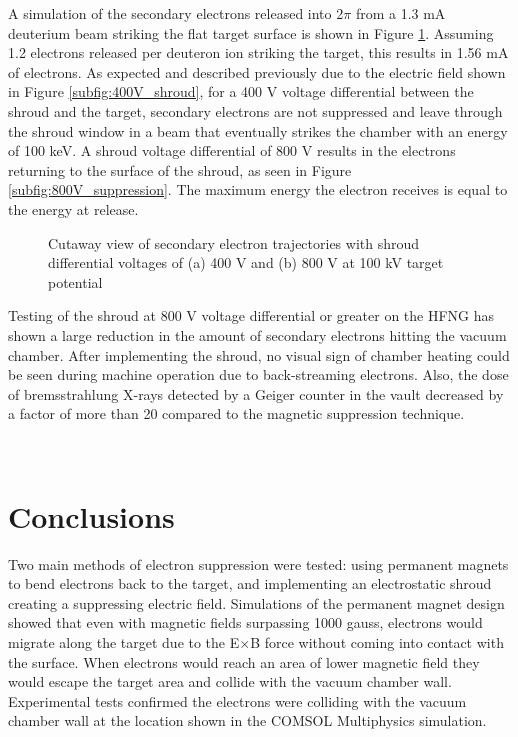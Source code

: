 \documentclass[aps,prstab,twocolumn,superscriptaddress]{revtex4-1}
\begin{document}
A simulation of the secondary electrons released into 2$\pi$ from a 1.3 mA deuterium beam striking the flat target surface is shown in Figure \ref{fig:shroud_suppression}. Assuming 1.2 electrons released per deuteron ion striking the target, this results in 1.56 mA of electrons. As expected and described previously due to the electric field shown in Figure \ref{subfig:400V_shroud}, for a 400 V voltage differential between the shroud and the target, secondary electrons are not suppressed and leave through the shroud window in a beam that eventually strikes the chamber with an energy of 100 keV. A shroud voltage differential of 800 V results in the electrons returning to the surface of the shroud, as seen in Figure \ref{subfig:800V_suppression}. The maximum energy the electron receives is equal to the energy at release.  

\begin{figure}
	\centering
	\hfill
	\caption{Cutaway view of secondary electron trajectories with shroud differential voltages of (a) 400 V and (b) 800 V at 100 kV target potential}
	\label{fig:shroud_suppression}
	
\end{figure}
Testing of the shroud at 800 V voltage differential or greater on the HFNG has shown a large reduction in the amount of secondary electrons hitting the vacuum chamber. After implementing the shroud, no visual sign of chamber heating could be seen during machine operation due to back-streaming electrons. Also, the dose of bremsstrahlung X-rays detected by a Geiger counter in the vault decreased by a factor of more than 20 compared to the magnetic suppression technique.  

~

\section{Conclusions}

Two main methods of electron suppression were tested: using permanent magnets to bend electrons back to the target, and implementing an electrostatic shroud creating a suppressing electric field. Simulations of the permanent magnet design showed that even with magnetic fields surpassing 1000 gauss, electrons would migrate along the target due to the E$\times$B force without coming into contact with the surface. When electrons would reach an area of lower magnetic field they would escape the target area and collide with the vacuum chamber wall. Experimental tests confirmed the electrons were colliding with the vacuum chamber wall at the location shown in the COMSOL Multiphysics\textsuperscript{\textregistered} simulation.
\end{document}
